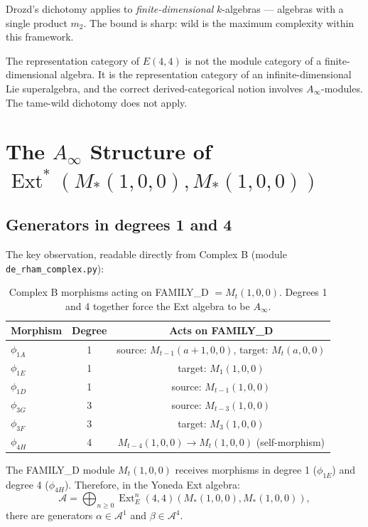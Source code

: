 \documentclass[reqno,10pt]{amsart}
\theoremstyle{plain}
\theoremstyle{definition}
\def\Ext{\operatorname{Ext}}
\def\gE{E(4,4)}
\begin{document}
Drozd's dichotomy applies to \emph{finite-dimensional} $k$-algebras — algebras
with a single product $m_2$.  The bound is sharp: wild is the maximum
complexity within this framework.

The representation category of $\gE$ is not the module category of a
finite-dimensional algebra.  It is the representation category of an
infinite-dimensional Lie superalgebra, and the correct derived-categorical
notion involves $A_\infty$-modules.  The tame-wild dichotomy does not apply.

\section{The $A_\infty$ Structure of $\Ext^*(M_*(1,0,0), M_*(1,0,0))$}
\label{sec:ext}

\subsection{Generators in degrees 1 and 4}

The key observation, readable directly from Complex B
(module \texttt{de\_rham\_complex.py}):

\begin{table}[h]
\centering
\begin{tabular}{lcc}
\toprule
Morphism & Degree & Acts on FAMILY\_D \\
\midrule
$\phi_{1A}$ & 1 & source: $M_{t-1}(a+1,0,0)$, target: $M_t(a,0,0)$ \\
$\phi_{1E}$ & 1 & target: $M_1(1,0,0)$ \\
$\phi_{1D}$ & 1 & source: $M_{t-1}(1,0,0)$ \\
$\phi_{3G}$ & 3 & source: $M_{t-3}(1,0,0)$ \\
$\phi_{3F}$ & 3 & target: $M_3(1,0,0)$ \\
$\phi_{4H}$ & 4 & $M_{t-4}(1,0,0) \to M_t(1,0,0)$ (self-morphism) \\
\bottomrule
\end{tabular}
\caption{Complex B morphisms acting on FAMILY\_D $= M_t(1,0,0)$.
  Degrees 1 and 4 together force the Ext algebra to be $A_\infty$.}
\label{tab:morphisms}
\end{table}

The FAMILY\_D module $M_t(1,0,0)$ receives morphisms in degree 1 ($\phi_{1E}$)
and degree 4 ($\phi_{4H}$).  Therefore, in the Yoneda Ext algebra:
\[
  \mathcal{A} = \bigoplus_{n \geq 0} \Ext^n_\gE(M_*(1,0,0), M_*(1,0,0)),
\]
there are generators $\alpha \in \mathcal{A}^1$ and $\beta \in \mathcal{A}^4$.
\end{document}
